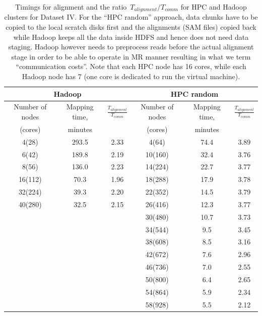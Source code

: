 \documentclass[10pt]{article}
\begin{document}
\begin{table}[!ht]
\caption{Timings  for alignment and the ratio~$T_{alignment}/T_{comm}$ for HPC and Hadoop clusters for Dataset IV.
For the ``HPC random'' approach, data chunks have to be copied to the local scratch disks first and the alignments (SAM files) copied back while Hadoop keeps all the data inside HDFS and hence does not need data staging. Hadoop however needs to preprocess reads before the actual alignment stage in order to be able to operate in MR manner resulting in what we term ``communication costs''. Note that each HPC node has 16 cores, while each Hadoop node has 7 (one core is dedicated to run the virtual machine).}
\begin{center}
\begin{tabular}{c|c|c|c|c|c}
 \multicolumn{3}{c|}{Hadoop} & \multicolumn{3}{c}{ HPC random} \\
 \hline		


Number of nodes	&Mapping time,	&$\frac{T_{alignment}}{T_{comm}}$	&Number of nodes	&Mapping time,	&$\frac{T_{alignment}}{T_{comm}}$\\
(cores)					&minutes		&							&(cores)			&minutes&\\
\hline
4(28)	&293.5	&2.33	&4(64)	&74.4	&3.89\\
6(42)	&189.8	&2.19	&10(160)	&32.4	&3.76\\
8(56)	&136.0	&2.23	&14(224)	&22.7	&3.77\\
16(112)	&70.3	&1.96	&18(288)	&17.9	&3.78\\
32(224)	&39.3	&2.20	&22(352)	&14.5	&3.79\\
40(280)	&32.5	&2.15	&26(416)	&12.3	&3.77\\
			&&&30(480)	&10.7	&3.73\\
			&&&34(544)	&9.5	&3.45\\
			&&&38(608)	&8.5	&3.16\\
			&&&42(672)	&7.6	&2.96\\
			&&&46(736)	&7.0	&2.55\\
			&&&50(800)	&6.4	&2.65\\
			&&&54(864)	&5.9	&2.34\\
			&&&58(928)	&5.5	&2.12\\

\end{tabular}
\end{center}
\label{table:6}
\end{table}%
\end{document}
